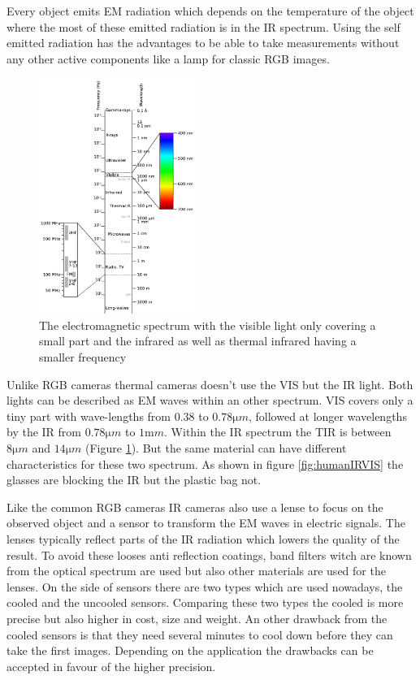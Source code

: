 Every object emits \ac{EM} radiation which depends on the temperature of the object where the most of these emitted radiation is in the \ac{IR} spectrum.
Using the self emitted radiation has the advantages to be able to take measurements without any other active components like a lamp for classic RGB images.

\begin{figure}
	\centering
	\includegraphics[width=0.45\textwidth]{img/fundamentals/em_spectrum.png}
	\caption{The electromagnetic spectrum with the visible light only covering a small part and the infrared as well as thermal infrared having a smaller frequency \cite{spectrum}
	}
	\label{fig:spectrum}
\end{figure}

Unlike RGB cameras thermal cameras doesn't use the \ac{VIS} but the \ac{IR} light.
Both lights can be described as \ac{EM} waves within an other spectrum.
\ac{VIS} covers only a tiny part with wave-lengths from $0.38$ to $0.78\si{\micro m}$, followed at longer wavelengths by the \ac{IR} from $0.78\si{\micro m}$ to $1\si{\milli m}$.
Within the \ac{IR} spectrum the \ac{TIR} is between $8\si{\micro m}$ and $14\si{\micro m}$\cite{Vollmer2017} (Figure \ref{fig:spectrum}).
But the same material can have different characteristics for these two spectrum.
As shown in figure \ref{fig:humanIRVIS} the glasses are blocking the \ac{IR} but the plastic bag not.

Like the common RGB cameras \ac{IR} cameras also use a lense to focus on the observed object and a sensor to transform the \ac{EM} waves in electric signals.
The lenses typically reflect parts of the \ac{IR} radiation which lowers the quality of the result.
To avoid these looses anti reflection coatings, band filters witch are known from the optical spectrum are used\cite{Vollmer2017} but also other materials are used for the lenses.
On the side of sensors there are two types which are used nowadays, the cooled and the uncooled sensors.
Comparing these two types the cooled is more precise but also higher in cost, size and weight.
An other drawback from the cooled sensors is that they need several minutes to cool down before they can take the first images.
Depending on the application the drawbacks can be accepted in favour of the higher precision.

